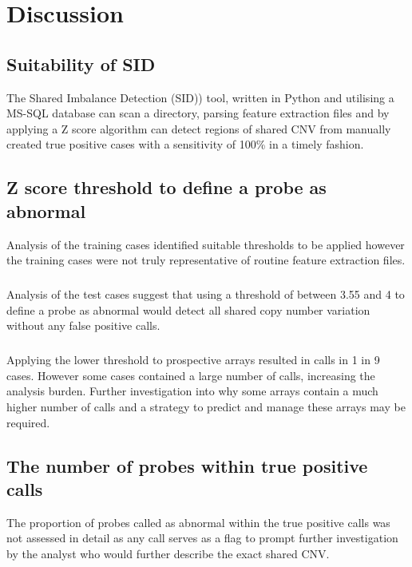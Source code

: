 \chapter{Discussion}\label{ch:Discussion} 
\section{Suitability of SID}
The Shared Imbalance Detection (SID)) tool, written in Python and utilising a MS-SQL database can scan a directory, parsing feature extraction files and by applying a Z score algorithm can detect regions of shared CNV from manually created true positive cases with a sensitivity of 100\% in a timely fashion.


\section{Z score threshold to define a probe as abnormal}
Analysis of the training cases identified suitable thresholds to be applied however the training cases were not truly representative of routine feature extraction files.
\paragraph*{}
Analysis of the test cases suggest that using a threshold of between 3.55 and 4 to define a probe as abnormal would detect all shared copy number variation without any false positive calls. 

\paragraph*{}
Applying the lower threshold to prospective arrays resulted in calls in 1 in 9 cases. However some cases contained a large number of calls, increasing the analysis burden. Further investigation into why some arrays contain a much higher number of calls and a strategy to predict and manage these arrays may be required.

\section{The number of probes within true positive calls}
The proportion of probes called as abnormal within the true positive calls was not assessed in detail as any call serves as a flag to prompt further investigation by the analyst who would further describe the exact shared CNV.
